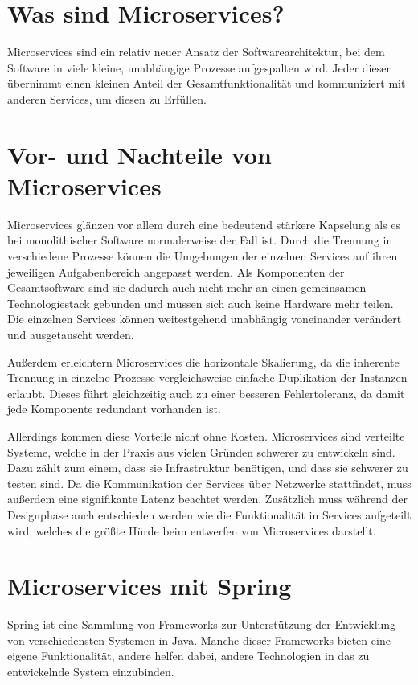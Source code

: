 \documentclass{article}
\begin{document}
\section{Was sind Microservices?}

Microservices sind ein relativ neuer Ansatz der Softwarearchitektur, bei dem Software in viele kleine, unabhängige Prozesse aufgespalten wird\cite{OMA}. Jeder dieser übernimmt einen kleinen Anteil der Gesamtfunktionalität und kommuniziert mit anderen Services, um diesen zu Erfüllen\cite{EMMA}.

\section{Vor- und Nachteile von Microservices}

Microservices glänzen vor allem durch eine bedeutend stärkere Kapselung als es bei monolithischer Software normalerweise der Fall ist. Durch die Trennung in verschiedene Prozesse können die Umgebungen der einzelnen Services auf ihren jeweiligen Aufgabenbereich angepasst werden. Als Komponenten der Gesamtsoftware sind sie dadurch auch nicht mehr an einen gemeinsamen Technologiestack gebunden und müssen sich auch keine Hardware mehr teilen. Die einzelnen Services können weitestgehend unabhängig voneinander verändert und ausgetauscht werden.

Außerdem erleichtern Microservices die horizontale Skalierung, da die inherente Trennung in einzelne Prozesse vergleichsweise einfache Duplikation der Instanzen erlaubt. Dieses führt gleichzeitig auch zu einer besseren Fehlertoleranz, da damit jede Komponente redundant vorhanden ist.

Allerdings kommen diese Vorteile nicht ohne Kosten. Microservices sind verteilte Systeme, welche in der Praxis aus vielen Gründen schwerer zu entwickeln sind. Dazu zählt zum einem, dass sie Infrastruktur benötigen, und dass sie schwerer zu testen sind. Da die Kommunikation der Services über Netzwerke stattfindet, muss außerdem eine signifikante Latenz beachtet werden. Zusätzlich muss während der Designphase auch entschieden werden wie die Funktionalität in Services aufgeteilt wird, welches die größte Hürde beim entwerfen von Microservices darstellt.\cite{OMA}

\section{Microservices mit Spring}

Spring ist eine Sammlung von Frameworks zur Unterstützung der Entwicklung von verschiedensten Systemen in Java.
Manche dieser Frameworks bieten eine eigene Funktionalität, andere helfen dabei, andere Technologien in das zu entwickelnde System einzubinden.
\end{document}
